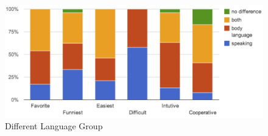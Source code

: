 \begin{figure}[!h]
\centering
\includegraphics[width=0.9\columnwidth]{Figures/US_FQ_Dif.png}
\caption{Different Language Group}
\label{fig:US_FQ_Dif}
\end{figure}



